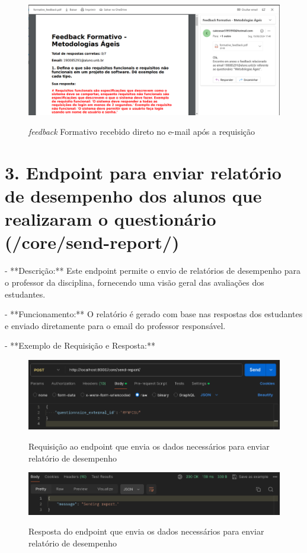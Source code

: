 \begin{figure}[H]
    \centering
    \caption{\textit{feedback} Formativo recebido direto no e-mail após a requisição}
    \includegraphics[width=1\textwidth]{figuras/feedback.png}
    \label{fig:report_questions}
\end{figure}

\section*{3. Endpoint para enviar relatório de desempenho dos alunos que realizaram o questionário (/core/send-report/)}

- **Descrição:** Este endpoint permite o envio de relatórios de desempenho para o professor da disciplina, fornecendo uma visão geral das avaliações dos estudantes.

- **Funcionamento:** O relatório é gerado com base nas respostas dos estudantes e enviado diretamente para o email do professor responsável.

- **Exemplo de Requisição e Resposta:**
  
\begin{figure}[H]
    \centering
    \caption{Requisição ao endpoint que envia os dados necessários para enviar relatório de desempenho}
    \includegraphics[width=1\textwidth]{figuras/send_report_teacher.png}
    \label{fig:report_questions}
\end{figure}

\begin{figure}[H]
    \centering
    \caption{Resposta do endpoint que envia os dados necessários para enviar relatório de desempenho}
    \includegraphics[width=1\textwidth]{figuras/send_report_teacher_result.png}
    \label{fig:report_questions}
\end{figure}

